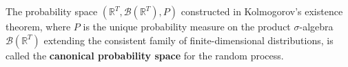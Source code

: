 The probability space $(\mathbb{R}^T, \mathcal{B}(\mathbb{R}^T), P)$ constructed in Kolmogorov's existence theorem, where $P$ is the unique probability measure on the product $\sigma$-algebra $\mathcal{B}(\mathbb{R}^T)$ extending the consistent family of finite-dimensional distributions, is called the \textbf{canonical probability space} for the random process.
